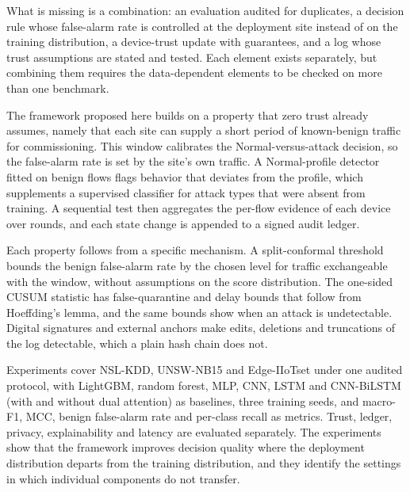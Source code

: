 \documentclass[journal]{IEEEtran}
\begin{document}
What is missing is a combination: an evaluation audited for duplicates, a decision rule whose false-alarm rate is controlled at the deployment site instead of on the training distribution, a device-trust update with guarantees, and a log whose trust assumptions are stated and tested. Each element exists separately, but combining them requires the data-dependent elements to be checked on more than one benchmark.

The framework proposed here builds on a property that zero trust already assumes, namely that each site can supply a short period of known-benign traffic for commissioning. This window calibrates the Normal-versus-attack decision, so the false-alarm rate is set by the site's own traffic. A Normal-profile detector fitted on benign flows flags behavior that deviates from the profile, which supplements a supervised classifier for attack types that were absent from training. A sequential test then aggregates the per-flow evidence of each device over rounds, and each state change is appended to a signed audit ledger.

Each property follows from a specific mechanism. A split-conformal threshold bounds the benign false-alarm rate by the chosen level for traffic exchangeable with the window, without assumptions on the score distribution. The one-sided CUSUM statistic has false-quarantine and delay bounds that follow from Hoeffding's lemma, and the same bounds show when an attack is undetectable. Digital signatures and external anchors make edits, deletions and truncations of the log detectable, which a plain hash chain does not.

Experiments cover NSL-KDD, UNSW-NB15 and Edge-IIoTset under one audited protocol, with LightGBM, random forest, MLP, CNN, LSTM and CNN-BiLSTM (with and without dual attention) as baselines, three training seeds, and macro-F1, MCC, benign false-alarm rate and per-class recall as metrics. Trust, ledger, privacy, explainability and latency are evaluated separately. The experiments show that the framework improves decision quality where the deployment distribution departs from the training distribution, and they identify the settings in which individual components do not transfer.
\end{document}
